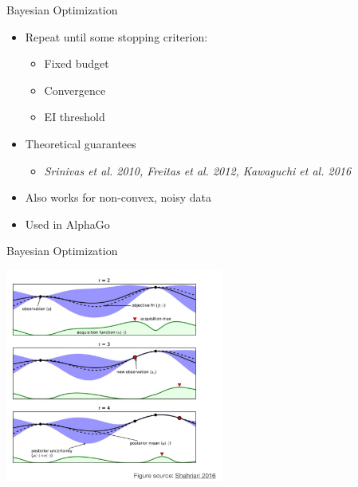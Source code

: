 \begin{frame}{Bayesian Optimization}

\begin{itemize}
    \item Repeat until some stopping criterion:
        \begin{itemize}
            \item Fixed budget
            \item Convergence
            \item EI threshold
        \end{itemize}
    \item Theoretical guarantees 
        \begin{itemize}
            \item \textit{Srinivas et al. 2010, Freitas et al. 2012, Kawaguchi et al. 2016}
        \end{itemize}
    \item Also works for non-convex, noisy data
    \item Used in AlphaGo
\end{itemize}

\end{frame}
\begin{frame}{Bayesian Optimization}

\centering\includegraphics[height=7cm]{image/img202037.jpg}


\end{frame}
